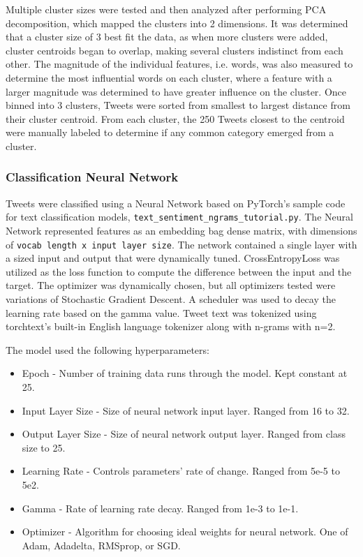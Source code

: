 \documentclass[12pt,letterpaper,oneside,titlepage]{article}
\begin{document}
Multiple cluster sizes were tested and then analyzed after performing PCA decomposition, which mapped the 
clusters into 2 dimensions.
It was determined that a cluster size of 3 best fit the data, as when more clusters were added, 
cluster centroids began to overlap, making several clusters indistinct from each other.
The magnitude of the individual features, i.e. words, was also measured to determine the 
most influential words on each cluster, where a feature with a larger magnitude was determined to have greater influence on the cluster. 
Once binned into 3 clusters, Tweets were sorted from smallest to largest distance from their cluster centroid.
From each cluster, the 250 Tweets closest to the centroid were manually labeled to determine if any common category emerged from a cluster.

\subsubsection{Classification Neural Network}\label{subsubsec:clnn}

Tweets were classified using a Neural Network based on PyTorch's sample code 
for text classification models, \lstinline{text_sentiment_ngrams_tutorial.py}\cite{torchtext}. 
The Neural Network represented features as an embedding bag dense matrix, 
with dimensions of \lstinline{vocab length x input layer size}\lstinline{}.
The network contained a single layer with a sized input and output that were dynamically tuned. 
CrossEntropyLoss was utilized as the loss function to compute the difference between the input and the target\cite{cel}.
The optimizer was dynamically chosen, but all optimizers tested were variations of Stochastic Gradient Descent\cite{sgd}.
A scheduler was used to decay the learning rate based on the gamma value\cite{scheduler}. Tweet text was tokenized 
using torchtext's built-in English language tokenizer along with n-grams with n=2\cite{torchtext_tokenizer}.

The model used the following hyperparameters:

\begin{itemize}
    \item Epoch - Number of training data runs through the model\cite{hyperparameters}. Kept constant at 25.
    \item Input Layer Size - Size of neural network input layer. Ranged from 16 to 32.
    \item Output Layer Size - Size of neural network output layer. Ranged from class size to 25.
    \item Learning Rate - Controls parameters' rate of change\cite{hyperparameters}. Ranged from 5e-5 to 5e2.
    \item Gamma - Rate of learning rate decay\cite{torch_optim}. Ranged from 1e-3 to 1e-1.
    \item Optimizer - Algorithm for choosing ideal weights for neural network\cite{optimizer}. One of Adam, Adadelta, RMSprop, or SGD.
\end{itemize}
\end{document}
